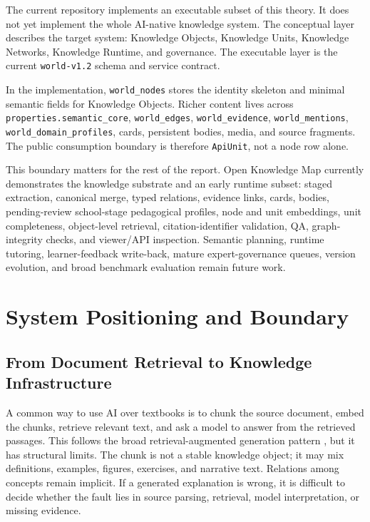 \documentclass[11pt,letterpaper]{article}
\newcommand{\code}[1]{\nolinkurl{#1}}
\newcommand{\OKM}{Open Knowledge Map}
\begin{document}
The current repository implements an executable subset of this theory. It does not yet implement the whole AI-native knowledge system. The conceptual layer describes the target system: Knowledge Objects, Knowledge Units, Knowledge Networks, Knowledge Runtime, and governance. The executable layer is the current \code{world-v1.2} schema and service contract.

In the implementation, \code{world_nodes} stores the identity skeleton and minimal semantic fields for Knowledge Objects. Richer content lives across \code{properties.semantic_core}, \code{world_edges}, \code{world_evidence}, \code{world_mentions}, \code{world_domain_profiles}, cards, persistent bodies, media, and source fragments. The public consumption boundary is therefore \code{ApiUnit}, not a node row alone.

This boundary matters for the rest of the report. \OKM{} currently demonstrates the knowledge substrate and an early runtime subset: staged extraction, canonical merge, typed relations, evidence links, cards, bodies, pending-review school-stage pedagogical profiles, node and unit embeddings, unit completeness, object-level retrieval, citation-identifier validation, QA, graph-integrity checks, and viewer/API inspection. Semantic planning, runtime tutoring, learner-feedback write-back, mature expert-governance queues, version evolution, and broad benchmark evaluation remain future work.

\section{System Positioning and Boundary}

\subsection{From Document Retrieval to Knowledge Infrastructure}

A common way to use AI over textbooks is to chunk the source document, embed the chunks, retrieve relevant text, and ask a model to answer from the retrieved passages. This follows the broad retrieval-augmented generation pattern \cite{rag,gao-rag-survey}, but it has structural limits. The chunk is not a stable knowledge object; it may mix definitions, examples, figures, exercises, and narrative text. Relations among concepts remain implicit. If a generated explanation is wrong, it is difficult to decide whether the fault lies in source parsing, retrieval, model interpretation, or missing evidence.
\end{document}
